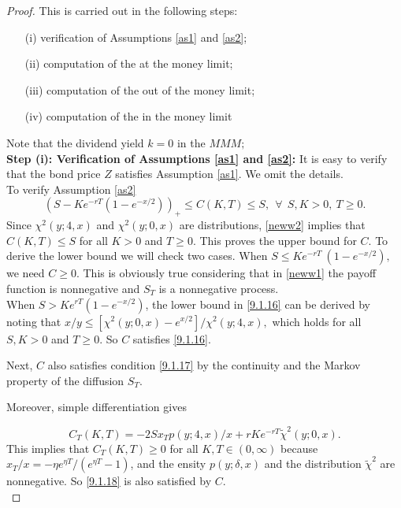 \documentclass[a4 paper, 12pt]{report}
\theoremstyle{plain}
\begin{document}
\begin{proof}\cite[pg.~10]{guo2011small}
This is carried out in the following steps:

\begin{enumerate}
\item[(i)] verification of Assumptions \ref{as1} and \ref{as2};
\item[(ii)] computation of the at the money limit;
\item[(iii)] computation of the out of the money limit;
\item[(iv)] computation of the in the money limit
\end{enumerate}
Note that the dividend yield $k = 0$ in the $MMM;$\\
\textbf{Step (i): Verification of Assumptions \ref{as1} and \ref{as2}:} It is easy to verify that the bond price $Z$ satisfies Assumption \ref{as1}. We omit the details.\\
To verify Assumption \ref{as2}
$$
(S - Ke^{-rT}(1-e^{-x/2}))_+\leq C(K,T)\leq S,~~\forall~~ S,K>0,~T\geq 0.
$$
Since $\chi^2(y;4,x)$ and $\chi^2(y;0,x)$  are distributions, \eqref{neww2} implies that $C(K, T) \leq S$ for all $K > 0$ and $T \geq  0.$ This proves the upper bound for $C.$ To derive the lower bound we will
check two cases. When $S \leq Ke^{-rT} ~(1 - e^{-x/2}),$ we need $C \geq 0$. This is obviously true
considering that in \eqref{neww1} the payoff function is nonnegative and $S_T$ is a nonnegative process.\\
When $S > Ke^{rT}(1 -  e^{-x/2})$, the lower bound in \eqref{9.1.16} can be derived by noting that $x/y\leq
[\chi^2(y; 0, x) - e^{x/2}]/\chi^2(y; 4, x),$ which holds for all $S, K > 0$ and $T \geq 0$. So $C$ satisfies \eqref{9.1.16}.\\

\par Next, $C$ also satisfies condition \eqref{9.1.17} by the continuity and the Markov property of the
diffusion $S_T$.\\

\par Moreover, simple differentiation gives

\begin{equation}\label{32}
C_T(K,T) = -2Sx_Tp(y;4,x)/x+rKe^{-rT}\tilde{\chi}^2(y;0,x).
\end{equation}
This implies that $C_T(K,T)\geq 0$ for all $K,T\in(0,\infty)$ because $x_T/x = -\eta e^{\eta T}/(e^{\eta T}-1)$, and the ensity $p(y;\delta,x)$ and the distribution $\tilde{\chi}^2$ are nonnegative. So \eqref{9.1.18} is also  satisfied by $C$.\\


\end{proof}
\end{document}
